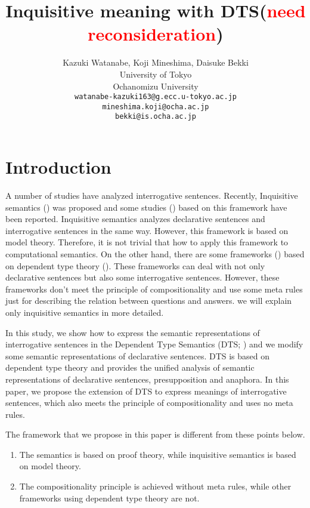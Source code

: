 \documentclass[a4paper,11pt, leqno]{article}
\title{Inquisitive meaning with DTS(\textcolor{red}{need reconsideration})}
\date{}
\author{Kazuki Watanabe, Koji Mineshima, Daisuke Bekki\\
       University of Tokyo\\
       Ochanomizu University\\
       \texttt{watanabe-kazuki163@g.ecc.u-tokyo.ac.jp}\\
       \texttt{mineshima.koji@ocha.ac.jp}\\
       \texttt{bekki@is.ocha.ac.jp}\\
}
\begin{document}
\maketitle
\thispagestyle{empty}
\pagestyle{empty}

\section{Introduction}
A number of studies have analyzed interrogative sentences. Recently, Inquisitive semantics (\citet{ciardelli2012inquisitive}) was proposed and some studies (\citet{Ciardelli2017, champollion2015some}) based on this framework have been reported. Inquisitive semantics analyzes declarative sentences and interrogative sentences in the same way. However, this framework is based on model theory. Therefore, it is not trivial that how to apply this framework to computational semantics.  On the other hand, there are some frameworks (\citet{ranta1994type, Ginzburg2005}) based on dependent type theory (\citet{martin1984intuitionistic}). These frameworks can deal with not only declarative sentences but also some interrogative sentences. However, these frameworks don't meet the principle of compositionality and  use some meta rules just for describing the relation between questions and answers. we will explain only inquisitive semantics in more detailed.\par

In this study, we show how to express the semantic representations of  interrogative sentences in the Dependent Type Semantics (DTS; \citet{BekkiMineshima2016}) and we modify some semantic representations of declarative sentences. DTS is based on dependent type theory and provides the unified analysis of semantic representations of declarative sentences, presupposition and anaphora. In this paper, we propose the extension of DTS to express meanings of interrogative sentences, which also meets the principle of compositionality and uses no meta rules.\par

The framework that we propose in this paper is different from these points below.
\begin{enumerate}
  \item The semantics is based on proof theory, while inquisitive semantics is based on model theory.
  \item The compositionality principle is achieved without meta rules, while other frameworks using dependent type theory are not.
\end{enumerate}
\par
\end{document}
